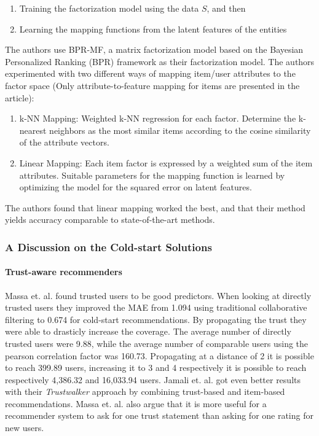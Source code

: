 \begin{enumerate}
\item Training the factorization model using the data $S$, and then
\item Learning the mapping functions from the latent features of the entities
\end{enumerate}

The authors use BPR-MF, a matrix factorization model based on the Bayesian
Personalized Ranking (BPR) framework as their factorization model. The authors
experimented with two different ways of mapping item/user attributes to the
factor space (Only attribute-to-feature mapping for items are presented in the
article):

\begin{enumerate}
\item k-NN Mapping:	Weighted k-NN regression for each factor. Determine the
k-nearest neighbors as the most similar items according to the cosine
similarity of the attribute vectors.
\item Linear Mapping: Each item factor is expressed by a weighted sum of the
item attributes. Suitable parameters for the mapping function is learned by
optimizing the model for the squared error on latent features.
\end{enumerate}

The authors found that linear mapping worked the best, and that their method
yields accuracy comparable to state-of-the-art methods.

\subsubsection{A Discussion on the Cold-start Solutions}

\paragraph{Trust-aware recommenders}

Massa et. al. \cite{Massa2007} found trusted users to be good predictors. When
looking at directly trusted users they improved the MAE from 1.094 using
traditional collaborative filtering to 0.674 for cold-start recommendations. By
propagating the trust they were able to drasticly increase the coverage. The
average number of directly trusted users were 9.88, while the average number of
comparable users using the pearson correlation factor was 160.73. Propagating
at a distance of 2 it is possible to reach 399.89 users, increasing it to 3 and
4 respectively it is possible to reach respectively 4,386.32 and 16,033.94
users. Jamali et. al. \cite{Jamali2009} got even better results with their
\emph{Trustwalker} approach by combining trust-based and item-based
recommendations. Massa et. al. \cite{Massa2004} also argue that it is more
useful for a recommender system to ask for one trust statement than asking for
one rating for new users.

